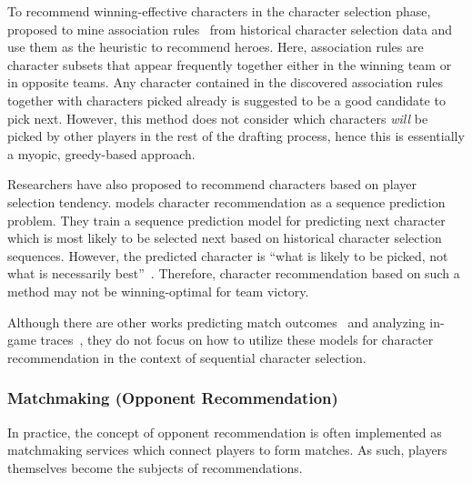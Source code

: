 To recommend winning-effective characters in the character selection phase, \cite{hanke2017reco} proposed to mine association rules~\cite{agrawal1994fast} from historical character selection data and use them as the heuristic to recommend heroes. Here, association rules are character subsets that appear frequently together either in the winning team or in opposite teams. Any character contained in the discovered association rules together with characters picked already is suggested to be a good candidate to pick next. However, this method does not consider which characters \textit{will} be picked  by other players in the rest of the drafting process, hence this is essentially a myopic, greedy-based approach.


Researchers have also proposed to recommend characters based on player selection tendency. \cite{summerville2017reco} models character recommendation as a sequence prediction problem. They train a sequence prediction model for predicting next character which is most likely to be selected next based on historical character selection sequences. However, the predicted character is ``what is
likely to be picked, not what is necessarily best''~\cite{summerville2017reco}. Therefore, character recommendation based on such a method may not be winning-optimal for team victory.

Although there are other works predicting match outcomes~\cite{Yang:identifying,Semenov2016,makarov2017predicting} and analyzing in-game traces~\cite{cavadenti2016did}, they do not focus on how to utilize these models for character recommendation in the context of sequential character selection.


\subsubsection{Matchmaking (Opponent Recommendation)}


In practice, the concept of opponent recommendation is often implemented as matchmaking services which connect players to form matches. As such, players themselves become the subjects of recommendations.


